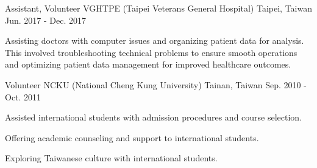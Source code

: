 

\begin{cventries}

  \cventry
    {Assistant, Volunteer} %
    {VGHTPE (Taipei Veterans General Hospital)} %
    {Taipei, Taiwan} %
    {Jun. 2017 - Dec. 2017} %
    {
      \begin{cvitems} %
        \item {Assisting doctors with computer issues and organizing patient data for analysis. This involved troubleshooting technical problems to ensure smooth operations and optimizing patient data management for improved healthcare outcomes.}
      \end{cvitems}
    }

  \cventry
    {Volunteer} %
    {NCKU (National Cheng Kung University)} %
    {Tainan, Taiwan} %
    {Sep. 2010 - Oct. 2011} %
    {
      \begin{cvitems} %
        \item {Assisted international students with admission procedures and course selection.}
        \item {Offering academic counseling and support to international students.}
        \item {Exploring Taiwanese culture with international students.}
      \end{cvitems}
    }

\end{cventries}
